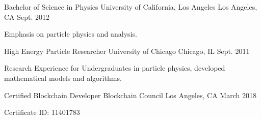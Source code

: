 


\begin{cventries}


\cventry
{Bachelor of Science in Physics} %
{University of California, Los Angeles} %
{Los Angeles, CA} %
{Sept. 2012} %
{ %
\begin{cvitems}
\item {Emphasis on particle physics and analysis.}
\end{cvitems}
}

\cventry
{High Energy Particle Researcher} %
{University of Chicago} %
{Chicago, IL} %
{Sept. 2011} %
{ %
\begin{cvitems}
\item {Research Experience for Undergraduates in particle physics, developed mathematical
models and algorithms.}
\end{cvitems}
}

\cventry
{Certified Blockchain Developer} %
{Blockchain Council} %
{Los Angeles, CA}
{March 2018} %
{ %
\begin{cvitems}
\item {Certificate ID: 11401783}
\end{cvitems}
}


\end{cventries}